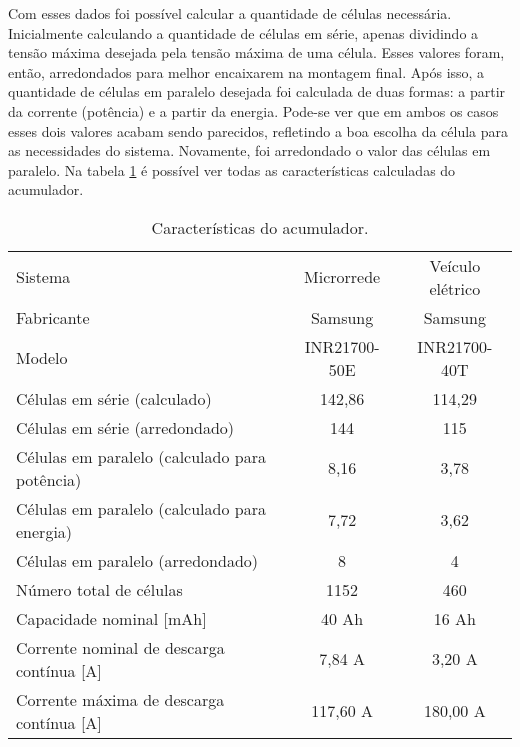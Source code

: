     Com esses dados foi possível calcular a quantidade de células necessária. Inicialmente calculando a quantidade de células em série, apenas dividindo a tensão máxima desejada pela tensão máxima de uma célula. Esses valores foram, então, arredondados para melhor encaixarem na montagem final. Após isso, a quantidade de células em paralelo desejada foi calculada de duas formas: a partir da corrente (potência) e a partir da energia. Pode-se ver que em ambos os casos esses dois valores acabam sendo parecidos, refletindo a boa escolha da célula para as necessidades do sistema. Novamente, foi arredondado o valor das células em paralelo. Na tabela \ref{tab:acc-projeto} é possível ver todas as características calculadas do acumulador.

    \begin{table}[!htp]
        \centering
        \caption{Características do acumulador.}
        \label{tab:acc-projeto}
        \begin{tabular}{lcc}
            \hline
            Sistema                                         & Microrrede    & Veículo elétrico  \\
            Fabricante                                      & Samsung       & Samsung           \\
            Modelo                                          & INR21700-50E  & INR21700-40T      \\
            Células em série (calculado)                    & 142,86        & 114,29            \\
            Células em série (arredondado)                  & 144           & 115               \\
            Células em paralelo (calculado para potência)   & 8,16          & 3,78              \\
            Células em paralelo (calculado para energia)    & 7,72          & 3,62              \\
            Células em paralelo (arredondado)               & 8             & 4                 \\
            Número total de células                         & 1152          & 460               \\
            Capacidade nominal [mAh]                        & 40 Ah         & 16 Ah             \\
            Corrente nominal de descarga contínua [A]       & 7,84 A        & 3,20 A            \\
            Corrente máxima de descarga contínua [A]        & 117,60 A      & 180,00 A          \\

\end{tabular}
\end{table}
